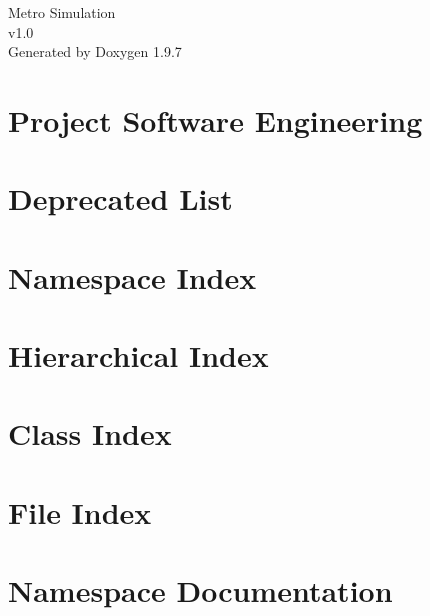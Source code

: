 \documentclass[twoside]{book}
\newcommand{\+}{\discretionary{\mbox{\scriptsize$\hookleftarrow$}}{}{}}
\newcommand{\clearemptydoublepage}{%
    \newpage{\pagestyle{empty}\cleardoublepage}%
  }
\begin{document}
  \raggedbottom
    \hypersetup{pageanchor=false,
                bookmarksnumbered=true,
                pdfencoding=unicode
               }
  \begin{titlepage}
  \vspace*{7cm}
  \begin{center}%
  {\Large Metro Simulation}\\
  [1ex]\large v1.\+0 \\
  \vspace*{1cm}
  {\large Generated by Doxygen 1.9.7}\\
  \end{center}
  \end{titlepage}
  \clearemptydoublepage
  \tableofcontents
  \clearemptydoublepage
  \hypersetup{pageanchor=true}
\chapter{Project Software Engineering}
\label{index}\hypertarget{index}{}
\chapter{Deprecated List}
\label{deprecated}

\chapter{Namespace Index}

\chapter{Hierarchical Index}

\chapter{Class Index}

\chapter{File Index}

\chapter{Namespace Documentation}

\end{document}
